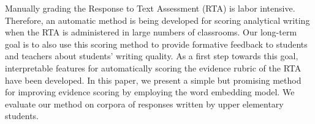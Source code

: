 Manually grading the Response to Text Assessment (RTA) is labor intensive. Therefore, an automatic method is being developed for scoring analytical writing when the RTA is administered in large numbers of classrooms. Our long-term goal is to also use this scoring method to provide formative feedback to students and teachers about students' writing quality.  As a first step towards this goal, interpretable features for automatically scoring the evidence rubric of the RTA have been developed. In this paper, we present a simple but promising method for improving evidence scoring by employing the word embedding model. We evaluate our method on corpora of responses written by upper elementary students.
